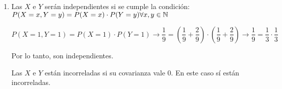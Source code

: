 \begin{enumerate}[label=\color{red}\arabic*), leftmargin=*]
\begin{enumerate}[label=\color{red}\alph*)]
		\item {}
		
		Las \vas $X$ e $Y$ serán independientes si se cumple la condición: $P(X=x,Y=y)=P(X=x)\cdot P(Y=y)\forall x,y\in\operatorname{\mathbb{N}}$
		
		$P(X=1,Y=1)=P(X=1)\cdot P(Y=1)\longrightarrow \dfrac{1}{9}=\left(\dfrac{1}{9}+\dfrac{2}{9}\right)\cdot\left(\dfrac{1}{9}+\dfrac{2}{9}\right)\longrightarrow\dfrac{1}{9}=\dfrac{1}{3}\cdot\dfrac{1}{3}$
		
		Por lo tanto, son independientes.
		
		Las \vas $X$ e $Y$ están incorreladas si su covarianza vale 0. En este caso sí están incorreladas.
	\end{enumerate}
\end{enumerate}